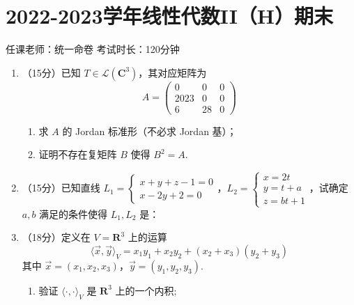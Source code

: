 \section{2022-2023学年线性代数II（H）期末}

\begin{center}
    任课老师：统一命卷\hspace{4em} 考试时长：120分钟
\end{center}

\begin{enumerate}
    \item （15分）已知 $ T \in \mathcal{L}(\mathbf{C}^3) $，其对应矩阵为
    \[ A = \begin{pmatrix} 0 & 0 & 0 \\ 2023 & 0 & 0 \\ 6 & 28 & 0 \end{pmatrix} \]
    \begin{enumerate}
        \item 求 $A$ 的 Jordan 标准形（不必求 Jordan 基）；

        \item 证明不存在复矩阵 $B$ 使得 $B^2 = A$.
    \end{enumerate}
	\item （15分）已知直线 $ L_1 = \begin{cases} x + y + z - 1 = 0 \\ x - 2y + 2 = 0 \end{cases} $，$ L_2 = \begin{cases} x = 2t \\ y = t + a \\ z = bt + 1 \end{cases} $，试确定 $ a, b $ 满足的条件使得 $ L_1, L_2 $ 是：


	\item （18分）定义在 $ V = \mathbf{R}^3 $ 上的运算
    \[ \langle \vec{x}, \vec{y} \rangle_V = x_1 y_1 + x_2 y_2 + (x_2 + x_3)(y_2 + y_3) \]
    其中 $ \vec{x} = (x_1, x_2, x_3) $，$ \vec{y} = (y_1, y_2, y_3) $.
    \begin{enumerate}
        \item 验证 $ \langle \cdot, \cdot \rangle_V $ 是 $ \mathbf{R}^3 $ 上的一个内积;


\end{enumerate}
\end{enumerate}
